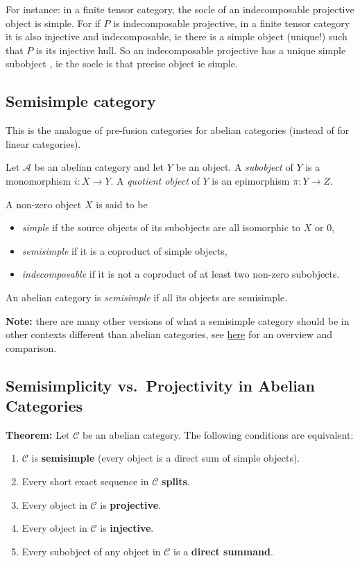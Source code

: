 \documentclass[11pt]{article}
\theoremstyle{definition}
\begin{document}
For instance: in a finite tensor category, the socle of an indecomposable projective object is simple. For  if $P$ is indecomposable projective, in a finite tensor category it is also injective and indecomposable, ie there is a simple object (unique!) such that $P$ is its injective hull. So an indecomposable projective has a unique simple subobject , ie the socle is that precise object ie simple.



\subsection{Semisimple category}
This is the analogue of pre-fusion categories for abelian categories (instead of for linear categories).

Let \( \mathcal{A} \) be an abelian category and let \(Y\) be an object. A \emph{subobject} of \(Y\) is a monomorphism \(i: X \to Y\). A \emph{quotient object} of \(Y\) is an epimorphism \(\pi: Y \to Z\).

A non-zero object \(X\) is said to be
\begin{itemize}
  \item[(i)] \emph{simple} if the source objects of its subobjects are all isomorphic to \(X\) or \(0\),
  \item[(ii)] \emph{semisimple} if it is a coproduct of simple objects,
  \item[(iii)] \emph{indecomposable} if it is not a coproduct of at least two non-zero subobjects.
\end{itemize}

An abelian category is \emph{semisimple} if all its objects are semisimple.

\medskip
\noindent\textbf{Note:} there are many other versions of what a semisimple category should be in other contexts different than abelian categories, see \href{https://jameshbailie.github.io/Papers/papers/Semisimple.pdf}{here} for an overview and comparison.



\subsection{Semisimplicity vs.\ Projectivity in Abelian Categories}

\textbf{Theorem:}
Let \(\mathcal{C}\) be an abelian category. The following conditions are equivalent:
\begin{enumerate}
    \item \(\mathcal{C}\) is \textbf{semisimple} (every object is a direct sum of simple objects).
    \item Every short exact sequence in \(\mathcal{C}\) \textbf{splits}.
    \item Every object in \(\mathcal{C}\) is \textbf{projective}.
    \item Every object in \(\mathcal{C}\) is \textbf{injective}.
    \item Every subobject of any object in \(\mathcal{C}\) is a \textbf{direct summand}.
\end{enumerate}
\end{document}
